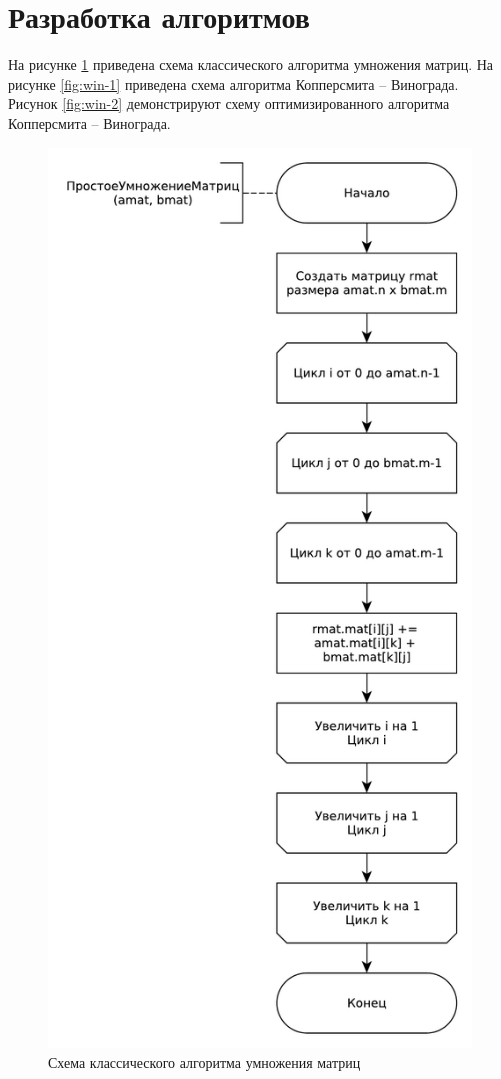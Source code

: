 \section{Разработка алгоритмов}
На рисунке \ref{fig:alg} приведена схема классического алгоритма умножения матриц. На рисунке \ref{fig:win-1} приведена схема алгоритма Копперсмита -- Винограда. Рисунок  
\ref{fig:win-2} демонстрируют схему оптимизированного алгоритма Копперсмита -- Винограда.\newpage

\begin{figure}[ht!]
	\centering
	\includegraphics[width=0.65\linewidth]{assets/mtx-alg.pdf}
	\caption{Схема классического алгоритма умножения матриц}
	\label{fig:alg}
\end{figure}

